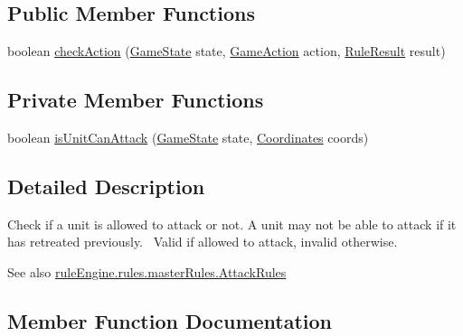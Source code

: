 \subsection*{Public Member Functions}
\begin{DoxyCompactItemize}
\item 
boolean \mbox{\hyperlink{classrule_engine_1_1rules_1_1atomic_rules_1_1_check_can_attack_unit_a12e775dc4a03dbda55a2d20d4a7138da}{check\+Action}} (\mbox{\hyperlink{classgame_1_1game_state_1_1_game_state}{Game\+State}} state, \mbox{\hyperlink{classrule_engine_1_1_game_action}{Game\+Action}} action, \mbox{\hyperlink{classrule_engine_1_1_rule_result}{Rule\+Result}} result)
\end{DoxyCompactItemize}
\subsection*{Private Member Functions}
\begin{DoxyCompactItemize}
\item 
boolean \mbox{\hyperlink{classrule_engine_1_1rules_1_1atomic_rules_1_1_check_can_attack_unit_a3cf631790ea887c5d1fe3a438f3224dc}{is\+Unit\+Can\+Attack}} (\mbox{\hyperlink{classgame_1_1game_state_1_1_game_state}{Game\+State}} state, \mbox{\hyperlink{classrule_engine_1_1_coordinates}{Coordinates}} coords)
\end{DoxyCompactItemize}


\subsection{Detailed Description}
Check if a unit is allowed to attack or not. A unit may not be able to attack if it has retreated previously.~\newline
 Valid if allowed to attack, invalid otherwise.

\begin{DoxySeeAlso}{See also}
\mbox{\hyperlink{classrule_engine_1_1rules_1_1master_rules_1_1_attack_rules}{rule\+Engine.\+rules.\+master\+Rules.\+Attack\+Rules}} 
\end{DoxySeeAlso}


\subsection{Member Function Documentation}
\mbox{\label{classrule_engine_1_1rules_1_1atomic_rules_1_1_check_can_attack_unit_a12e775dc4a03dbda55a2d20d4a7138da}} 
